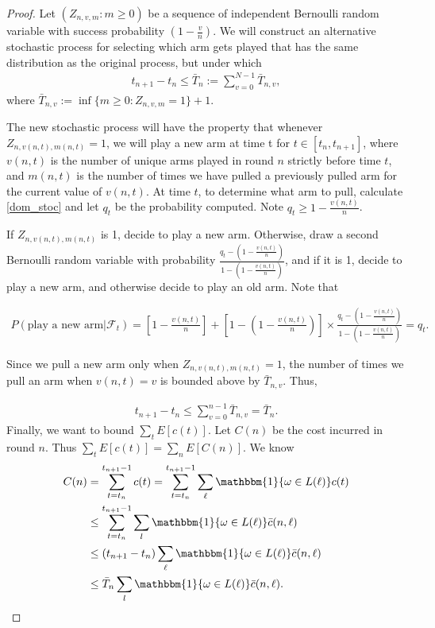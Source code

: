 \begin{proof}
Let $(Z_{n,v,m}:m\geq 0)$ be a sequence of independent Bernoulli random variable with success probability $(1-\frac{v}{n})$. We will construct an alternative stochastic process for selecting which arm gets played that has the same distribution as the original process, but under which
\begin{align}
t_{n+1}-t_{n}\leq \bar{T}_{n}:=\sum_{v=0}^{N-1}\bar{T}_{n,v}, \nonumber 
\end{align}
where $\bar{T}_{n,v}:=\inf\{m\geq 0: Z_{n,v,m}=1\}+1$.

The new stochastic process will have the property that whenever $Z_{n,v(n,t),m(n,t)}=1$, we will play a new arm at time t for $t\in [t_{n}, t_{n+1}]$, where $v(n,t)$ is the number of unique arms played in round $n$ strictly before time $t$, and $m(n,t)$ is the number of times we have pulled a previously pulled arm for the current value of $v(n,t)$. At time $t$, to determine what arm to pull, calculate \eqref{dom_stoc} and let $q_t$ be the probability computed. Note $q_t\geq 1-\frac{v(n,t)}{n}$.

If $Z_{n,v(n,t),m(n,t)}$ is 1, decide to play a new arm. Otherwise, draw a second Bernoulli random variable with probability $\frac{q_t-(1-\frac{v(n,t)}{n})}{1-(1-\frac{v(n,t)}{n})}$, and if it is 1, decide to play a new arm, and otherwise decide to play an old arm. Note that

\begin{align}
P(\text{play a new arm}|\mathcal{F}_{t})=\left[1-\frac{v(n,t)}{n}\right]+\left[1-(1-\frac{v(n,t)}{n})\right]\times \frac{q_t-(1-\frac{v(n,t)}{n})}{1-(1-\frac{v(n,t)}{n})}=q_t.
\end{align}

Since we pull a new arm only when $Z_{n,v(n,t),m(n,t)}=1$, the number of times we pull an arm when $v(n,t)=v$ is bounded above by $\bar{T}_{n,v}$. Thus,

\begin{align}
t_{n+1}-t_{n}\leq \sum_{v=0}^{n-1}\bar{T}_{n,v}=\bar{T}_{n}.
\end{align}
Finally, we want to bound $\sum_{t}E[c(t)]$. Let $C(n)$ be the cost incurred in round $n$. Thus $\sum_{t}E[c(t)]=\sum_{n}E[C(n)]$. We know
\begin{align}
C(n)&=\sum_{t=t_n}^{t_{n+1}-1}c(t)=\sum_{t=t_{n}}^{t_{n+1}-1}\sum_{\ell}\mathbbm{1}\{\omega\in L(\ell)\}c(t) \nonumber \\
&\leq \sum_{t=t_{n}}^{t_{n+1}-1}\sum_{l}\mathbbm{1}\{\omega\in L(\ell)\}\bar{c}(n,\ell) \nonumber \\
&\leq (t_{n+1}-t_{n})\sum_{\ell} \mathbbm{1}\{\omega\in L(\ell)\}\bar{c}(n,\ell) \nonumber \\
&\leq \bar{T}_{n}\sum_{l}\mathbbm{1}\{\omega\in L(\ell)\}\bar{c}(n,\ell). \nonumber
\end{align}


\end{proof}
